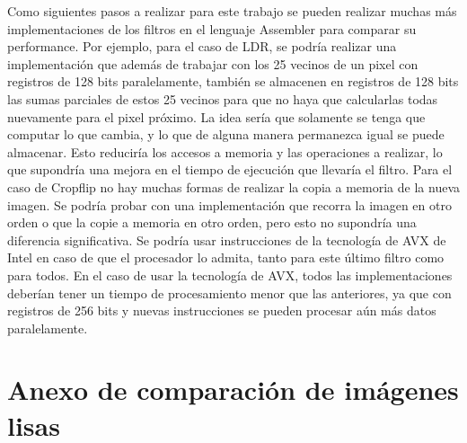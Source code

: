 \documentclass[a4paper]{article}
\begin{document}
\par
Como siguientes pasos a realizar para este trabajo se pueden realizar
muchas más implementaciones de los filtros en el lenguaje Assembler para comparar
su performance. Por ejemplo, para el caso de LDR, se podría realizar una implementación
que además de trabajar con los 25 vecinos de un pixel con registros de 128 bits paralelamente,
también se almacenen en registros de 128 bits las sumas parciales de estos 25 vecinos para que
no haya que calcularlas todas nuevamente para el pixel próximo. La idea sería que solamente se
tenga que computar lo que cambia, y lo que de alguna manera permanezca igual se puede almacenar.
Esto reduciría los accesos a memoria y las operaciones a realizar, lo que supondría una mejora en
el tiempo de ejecución que llevaría el filtro. Para el caso de
Cropflip no hay muchas formas de realizar la copia a memoria de la nueva imagen. Se podría probar
con una implementación que recorra la imagen en otro orden o que la copie a memoria en otro orden,
pero esto no supondría una diferencia significativa. Se podría usar instrucciones de la tecnología
de AVX de Intel en caso de que el procesador lo admita, tanto para este último filtro como para todos.
En el caso de usar la tecnología de AVX, todos las implementaciones deberían tener un tiempo de
procesamiento menor que las anteriores, ya que con registros de 256 bits y nuevas instrucciones se pueden
procesar aún más datos paralelamente.

\newpage
\section{Anexo de comparación de imágenes lisas}
\end{document}
